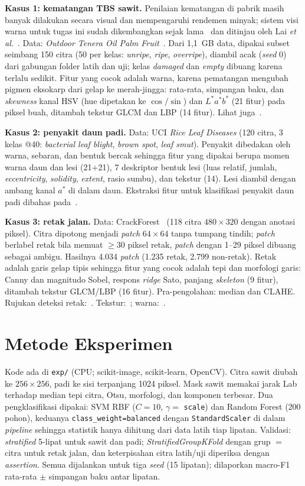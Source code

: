 \documentclass[conference]{IEEEtran}
\begin{document}
\textbf{Kasus 1: kematangan TBS sawit.} Penilaian kematangan di pabrik masih
banyak dilakukan secara visual dan mempengaruhi rendemen minyak; sistem visi
warna untuk tugas ini sudah dikembangkan sejak lama~\cite{fadilah2012} dan
ditinjau oleh Lai \emph{et al.}~\cite{lai2023}. Data: \emph{Outdoor Tenera Oil
Palm Fruit}~\cite{omar2024}. Dari 1,1~GB data, dipakai subset seimbang 150 citra
(50 per kelas: \emph{unripe}, \emph{ripe}, \emph{overripe}), diambil acak
(\emph{seed} 0) dari gabungan folder latih dan uji; kelas \emph{damaged} dan
\emph{empty} dibuang karena terlalu sedikit. Fitur yang cocok adalah warna,
karena pematangan mengubah pigmen eksokarp dari gelap ke merah-jingga:
rata-rata, simpangan baku, dan \emph{skewness} kanal HSV (hue dipetakan ke
$\cos/\sin$) dan $L^*a^*b^*$ (21 fitur) pada piksel buah, ditambah tekstur GLCM
dan LBP (14 fitur). Lihat juga~\cite{rosbi2024}.

\textbf{Kasus 2: penyakit daun padi.} Data: UCI \emph{Rice Leaf Diseases}
(120 citra, 3 kelas @40: \emph{bacterial leaf blight}, \emph{brown spot},
\emph{leaf smut}). Penyakit dibedakan oleh warna, sebaran, dan bentuk bercak
sehingga fitur yang dipakai berupa momen warna daun dan lesi (21+21), 7
deskriptor bentuk lesi (luas relatif, jumlah, \emph{eccentricity},
\emph{solidity}, \emph{extent}, rasio sumbu), dan tekstur (14). Lesi diambil
dengan ambang kanal $a^*$ di dalam daun. Ekstraksi fitur untuk klasifikasi penyakit daun padi dibahas pada~\cite{azim2021}.

\textbf{Kasus 3: retak jalan.} Data: CrackForest~\cite{shi2016} (118 citra
$480\times320$ dengan anotasi piksel). Citra dipotong menjadi \emph{patch}
$64\times64$ tanpa tumpang tindih; \emph{patch} berlabel retak bila memuat
$\ge 30$ piksel retak, \emph{patch} dengan 1--29 piksel dibuang sebagai ambigu.
Hasilnya 4.034 \emph{patch} (1.235 retak, 2.799 non-retak). Retak adalah garis
gelap tipis sehingga fitur yang cocok adalah tepi dan morfologi garis: Canny dan
magnitudo Sobel, respons \emph{ridge} Sato, panjang \emph{skeleton} (9 fitur),
ditambah tekstur GLCM/LBP (16 fitur). Pra-pengolahan: median dan CLAHE. Rujukan deteksi retak:~\cite{zou2012,shi2016}.
Tekstur:~\cite{haralick1973,ojala2002}; warna:~\cite{woebbecke1995,gijsenij2011}.

\section{Metode Eksperimen}
Kode ada di \texttt{exp/} (CPU; scikit-image, scikit-learn, OpenCV). Citra sawit diubah ke $256\times256$, padi ke sisi
terpanjang 1024 piksel. Mask sawit memakai jarak Lab terhadap median tepi
citra, Otsu, morfologi, dan komponen terbesar. Dua pengklasifikasi dipakai:
SVM RBF ($C=10$, $\gamma=$ \texttt{scale}) dan Random Forest (200 pohon), keduanya
\texttt{class\_weight=balanced} dengan \texttt{StandardScaler} di dalam
\emph{pipeline} sehingga statistik hanya dihitung dari data latih tiap lipatan.
Validasi: \emph{stratified}
5-lipat untuk sawit dan padi; \emph{StratifiedGroupKFold} dengan grup $=$ citra
untuk retak jalan, dan keterpisahan citra latih/uji diperiksa dengan
\emph{assertion}. Semua dijalankan untuk tiga \emph{seed} (15 lipatan);
dilaporkan macro-F1 rata-rata $\pm$ simpangan baku antar lipatan.
\end{document}
